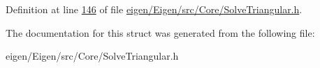 Definition at line \hyperlink{eigen_2_eigen_2src_2_core_2_solve_triangular_8h_source_l00146}{146} of file \hyperlink{eigen_2_eigen_2src_2_core_2_solve_triangular_8h_source}{eigen/\+Eigen/src/\+Core/\+Solve\+Triangular.\+h}.



The documentation for this struct was generated from the following file\+:\begin{DoxyCompactItemize}
\item 
eigen/\+Eigen/src/\+Core/\+Solve\+Triangular.\+h\end{DoxyCompactItemize}
